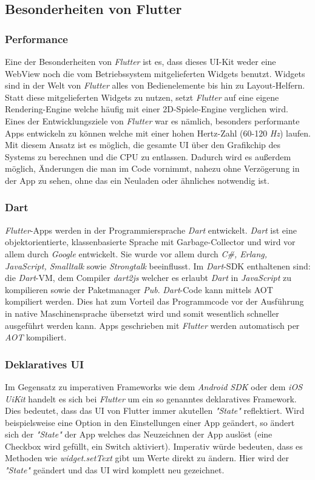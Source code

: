 \subsection{Besonderheiten von Flutter}
\subsubsection{Performance}
Eine der Besonderheiten von \textit{Flutter} ist es, dass dieses UI-Kit weder eine WebView
noch die vom Betriebssystem mitgelieferten Widgets benutzt. Widgets sind in der
Welt von \textit{Flutter} alles von Bedienelemente bis hin zu Layout-Helfern.
Statt diese mitgelieferten Widgets zu nutzen, setzt \textit{Flutter} auf eine
eigene Rendering-Engine welche häufig mit einer 2D-Spiele-Engine verglichen wird.
Eines der Entwicklungsziele von \textit{Flutter} war es nämlich,
besonders performante Apps entwickeln zu können welche mit einer hohen
Hertz-Zahl (60-120 \textit{Hz}) laufen. Mit diesem Ansatz ist es möglich,
die gesamte UI über den Grafikchip des Systems zu berechnen und die CPU zu entlassen.
Dadurch wird es außerdem möglich, Änderungen die man im Code vornimmt,
nahezu ohne Verzögerung in der App zu sehen, ohne das ein Neuladen oder ähnliches
notwendig ist.

\subsubsection{Dart}
\textit{Flutter}-Apps werden in der Programmiersprache \textit{Dart}
entwickelt. \textit{Dart} ist eine objektorientierte,
klassenbasierte Sprache mit Garbage-Collector und wird vor allem durch
\textit{Google} entwickelt. Sie wurde vor allem durch
\textit{C\#, Erlang, JavaScript, Smalltalk} sowie \textit{Strongtalk}
beeinflusst. Im \textit{Dart}-\ac{SDK} enthaltenen sind:
die \textit{Dart}-\ac{VM}, dem Compiler \textit{dart2js}
welcher es erlaubt \textit{Dart} in \textit{JavaScript}
zu kompilieren sowie der Paketmanager \textit{Pub}.
\textit{Dart}-Code kann mittels \ac{AOT} kompiliert werden.
Dies hat zum Vorteil das Programmcode vor der Ausführung in native
Maschinensprache übersetzt wird und somit wesentlich schneller ausgeführt
werden kann. Apps geschrieben mit \textit{Flutter} werden automatisch
per \textit{AOT} kompiliert.

\subsubsection{Deklaratives UI}
Im Gegensatz zu imperativen Frameworks wie dem \textit{Android SDK}
oder dem \textit{iOS UiKit} handelt es sich bei \textit{Flutter} um
ein so genanntes deklaratives Framework. Dies bedeutet,
dass das UI von Flutter immer akutellen \textit{"State"} reflektiert.
Wird beispielsweise eine Option in den Einstellungen einer App geändert,
so ändert sich der \textit{"State"} der App welches das Neuzeichnen
der App auslöst (eine Checkbox wird gefüllt, ein Switch aktiviert).
Imperativ würde bedeuten, dass es Methoden wie \textit{widget.setText}
gibt um Werte direkt zu ändern. Hier wird der \textit{"State"} geändert
und das UI wird komplett neu gezeichnet.

